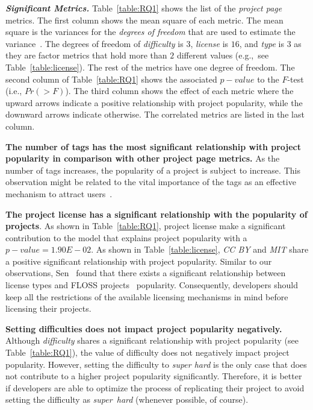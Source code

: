 \noindent\textbf{\textit{Significant Metrics.}}
Table~\ref{table:RQ1} shows the list of the {\em project page} metrics. The first column shows the mean square of each metric. The mean square is the variances for the {\em degrees of freedom} that are used to estimate the
variance~\cite{fisher1992statistical}. The degrees of freedom of {\em difficulty} is $3$, {\em license} is $16$, and {\em type} is $3$ as they are factor metrics that hold more than $2$ different values (e.g.,~see Table~\ref{table:license}). The rest of the metrics have one degree of freedom. The second column of Table~\ref{table:RQ1} shows the associated $p-value$ to the $F$-test~\cite{lomax2013statistical} (i.e., $Pr(>F)$).
The third column shows the effect of each metric where the upward arrows indicate a positive relationship with project popularity, while the downward arrows indicate otherwise.
The correlated metrics are listed in the last column.




\textbf{The number of tags has the most significant relationship with project popularity in comparison with other project page metrics.} As the number of tags increases, the popularity of a project is subject to increase.
This observation might be related to the vital importance of the tags as an effective mechanism to attract users~\cite{zarrella2009social}.

\textbf{The project license has a significant relationship with the popularity of projects}.
As shown in Table~\ref{table:RQ1}, project license make a significant contribution to the model that explains project popularity with a $p-value=1.90E-02$.
As shown in Table~\ref{table:license}, \textit{CC BY} and \textit{MIT} share a positive significant relationship with project popularity. Similar to our observations, Sen~\cite{sen2006open} found that there exists a significant relationship between license types and FLOSS projects~\cite{crowston2004towards} popularity.
Consequently, developers should keep all the restrictions of the available licensing mechanisms in mind before licensing their projects.


\textbf{Setting difficulties does not impact project popularity negatively.}
Although {\em difficulty} shares a significant relationship with project
popularity (see Table~\ref{table:RQ1}), the value of difficulty does not
negatively impact project popularity. However, setting the difficulty to
\textit{super hard} is the only case that does not contribute to a higher
project popularity significantly.  Therefore, it is better if developers are
able to optimize the process of replicating their project to avoid setting the
difficulty as {\em super~hard} (whenever possible, of course).


